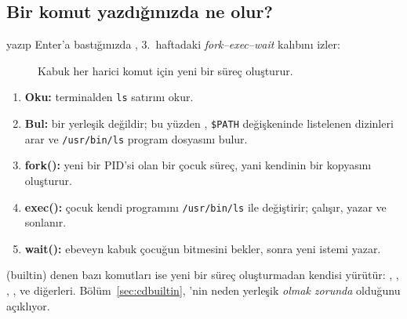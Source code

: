 \subsection{Bir komut yazdığınızda ne olur?}
\label{sec:forkexec}

 yazıp Enter'a bastığınızda , 3.\ haftadaki \emph{fork--exec--wait} kalıbını izler:

\begin{figure}[H]
\centering
{}
\caption{Kabuk her harici komut için yeni bir süreç oluşturur.}
\end{figure}

\begin{enumerate}[leftmargin=1.4em]
  \item \textbf{Oku:}  terminalden \texttt{ls} satırını okur.
  \item \textbf{Bul:}  bir yerleşik değildir; bu yüzden , \texttt{\$PATH} değişkeninde listelenen dizinleri arar ve \texttt{/usr/bin/ls} program dosyasını bulur.
  \item \textbf{fork():}  yeni bir PID'si olan bir çocuk süreç, yani kendinin bir kopyasını oluşturur.
  \item \textbf{exec():} çocuk kendi programını \texttt{/usr/bin/ls} ile değiştirir;  çalışır, yazar ve sonlanır.
  \item \textbf{wait():} ebeveyn kabuk çocuğun bitmesini bekler, sonra yeni istemi yazar.
\end{enumerate}

 (builtin) denen bazı komutları ise  yeni bir süreç oluşturmadan kendisi yürütür: , , , ,  ve diğerleri. Bölüm~\ref{sec:cdbuiltin}, 'nin neden yerleşik \emph{olmak zorunda} olduğunu açıklıyor.


